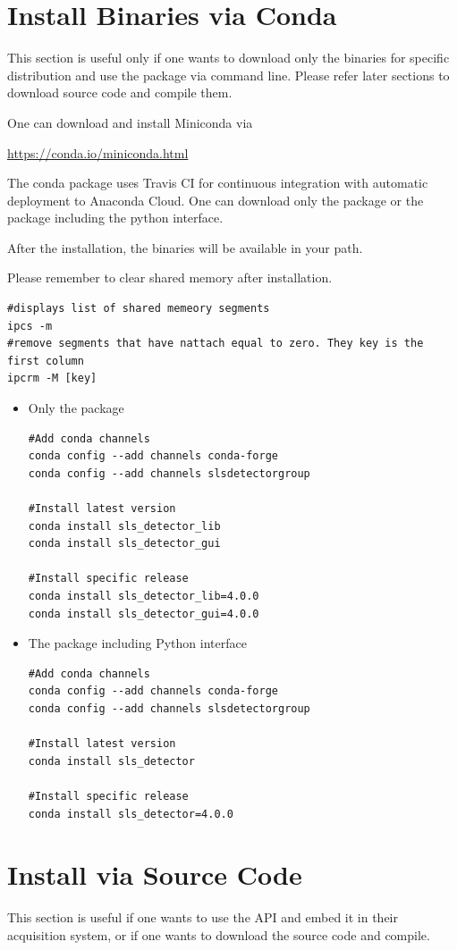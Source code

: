 \documentclass{article}
\begin{document}
\section{Install Binaries via Conda}
This section is useful only if one wants to download only the binaries for
specific distribution and use the package via command line. Please refer later
sections to download source code and compile them.


One can download and install Miniconda via 

\url{https://conda.io/miniconda.html}


The conda package uses Travis CI for continuous integration with
automatic deployment to Anaconda Cloud. One can download only the package or the
package including the python interface.


After the installation, the binaries will be available in your path.

Please remember to clear shared memory after installation.
\begin{verbatim}
#displays list of shared memeory segments 
ipcs -m
#remove segments that have nattach equal to zero. They key is the first column
ipcrm -M [key]
\end{verbatim}

\begin{itemize}
 \item Only the package
\begin{verbatim}
#Add conda channels
conda config --add channels conda-forge
conda config --add channels slsdetectorgroup

#Install latest version
conda install sls_detector_lib
conda install sls_detector_gui

#Install specific release
conda install sls_detector_lib=4.0.0
conda install sls_detector_gui=4.0.0

\end{verbatim}
 \item The package including Python interface
\begin{verbatim}
#Add conda channels
conda config --add channels conda-forge
conda config --add channels slsdetectorgroup

#Install latest version
conda install sls_detector

#Install specific release 
conda install sls_detector=4.0.0

\end{verbatim}
\end{itemize}


\clearpage
\section{Install via Source Code}
This section is useful if one wants to use the API and embed it in their
acquisition system, or if one wants to download the source code and compile.
\end{document}
